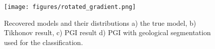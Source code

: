 \begin{figure}[htb]
    \vspace{-0.1cm}
    \begin{center}
    \texttt{[image: figures/rotated\_gradient.png]}
    \end{center}
    \vspace{-0.5cm}
\caption{
    Recovered models and their distributions a) the true model, b) Tikhonov result, c) PGI result d) PGI with geological segmentation used for the classification.
}
\label{fig:rotated_gradient}
\vspace{-0.1cm}
\end{figure}